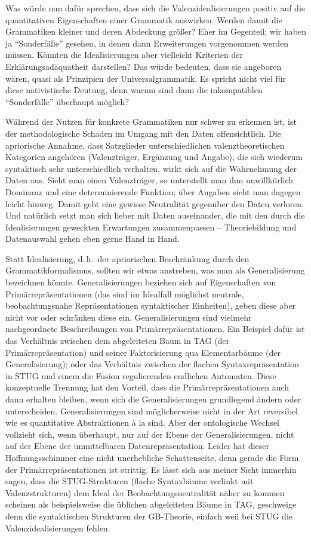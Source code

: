 Was würde nun dafür sprechen, dass sich die Valenzidealisierungen positiv auf die quantitativen Eigenschaften einer Grammatik auswirken. Werden damit die Grammatiken kleiner und deren Abdeckung größer? Eher im Gegenteil; wir haben ja "`Sonderfälle"' gesehen, in denen dann Erweiterungen vorgenommen werden müssen. Könnten die Idealisierungen aber vielleicht Kriterien der Erklärungsadäquatheit darstellen? Das würde bedeuten, dass sie angeboren wären, quasi als Prinzipien der Universalgrammatik. Es spricht nicht viel für diese nativistische Deutung, denn warum sind dann die inkompatiblen "`Sonderfälle"' überhaupt möglich?

Während der Nutzen für konkrete Grammatiken nur schwer zu erkennen ist, ist der methodologische Schaden im Umgang mit den Daten offensichtlich. Die apriorische Annahme, dass Satzglieder unterschiedlichen valenztheoretischen Kategorien angehören (Valenzträger, Ergänzung und Angabe), die sich wiederum syntaktisch sehr unterschiedlich verhalten, wirkt sich auf die Wahrnehmung der Daten aus. Sieht man einen Valenzträger, so unterstellt man ihm unwillkürlich Dominanz und eine determinierende Funktion; über Angaben sieht man dagegen leicht hinweg. Damit geht eine gewisse Neutralität gegenüber den Daten verloren. Und natürlich setzt man sich lieber mit Daten auseinander, die mit den durch die Idealisierungen geweckten Erwartungen zusammenpassen -- Theoriebildung und Datenauswahl gehen eben gerne Hand in Hand. 

Statt Idealisierung, d.\,h.\ der apriorischen Beschränkung durch den Grammatikformalismus, sollten wir etwas anstreben, was man als Generalisierung bezeichnen könnte. Generalisierungen beziehen sich auf Eigenschaften von Primärrepräsentationen (das sind im Idealfall möglichst neutrale, beobachtungsnahe Repräsentationen syntaktischer Einheiten), geben diese aber nicht vor oder schränken diese ein. Generalisierungen sind vielmehr nachgeordnete Beschreibungen von Primärrepräsentationen. Ein Beispiel dafür ist das Verhältnis zwischen dem abgeleiteten Baum in TAG (der Primärrepräsentation) und seiner Faktorisierung qua Elementarbäume (der Generalisierung); oder das Verhältnis zwischen der flachen Syntaxrepräsentation in STUG und einem die Fusion regulierenden endlichen Automaten. Diese konzeptuelle Trennung hat den Vorteil, dass die Primärrepräsentationen auch dann erhalten bleiben, wenn sich die Generalisierungen grundlegend ändern oder unterscheiden. Generalisierungen sind möglicherweise nicht in der Art reversibel wie es quantitative Abstraktionen à la \cite{Stokhof:Lambalgen:11} sind. Aber der ontologische Wechsel vollzieht sich, wenn überhaupt, nur auf der Ebene der Generalisierungen, nicht auf der Ebene der unmittelbaren Datenrepräsentation. Leider hat dieser Hoffnungsschimmer  eine nicht unerhebliche Schattenseite, denn gerade die Form der Primärrepräsentationen ist strittig. Es lässt sich aus meiner Sicht immerhin sagen, dass die STUG-Strukturen (flache Syntaxbäume verlinkt mit Valenzstrukturen) dem Ideal der Beobachtungsneutralität näher zu kommen scheinen als beispielsweise die üblichen abgeleiteten Bäume in TAG, geschweige denn die syntaktischen Strukturen der GB-Theorie, einfach weil bei STUG die Valenzidealisierungen fehlen.

